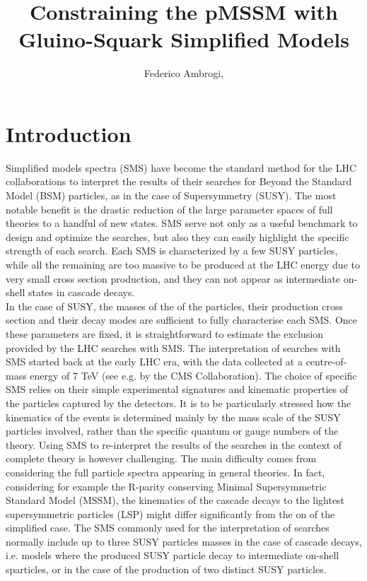 \documentclass[a4paper,11pt]{article}
\title{{\boldmath Constraining the pMSSM  with \\ Gluino-Squark Simplified Models}}
\author[a,]{Federico Ambrogi,\note{Corresponding author.}}
\affiliation[a]{Department of Meteorology and Geophysics, University of Vienna, Vienna, Austria}
\begin{document}
 
\maketitle
\flushbottom
\section{Introduction}
Simplified models spectra (SMS) have become the standard method for the LHC collaborations to interpret the results of their searches for Beyond the Standard Model (BSM) particles, as in the case of Supersymmetry (SUSY). The most notable benefit is the drastic reduction of the large parameter spaces of full theories to a handful of new states. SMS serve not only as a useful benchmark to design and optimize the searches, but also they can easily highlight the specific strength of each search. Each SMS is characterized by a few SUSY particles, while all the remaining are too massive to be produced at the LHC energy due to very small cross section production, and they can not appear as intermediate on-shell states in cascade decays. 
\\
In the case of SUSY, the masses of the of the particles, their production cross section and their decay modes are sufficient to fully characterise each SMS. Once these parameters are fixed, it is straightforward to estimate the exclusion provided by the LHC searches with SMS. The interpretation of searches with SMS started back at the early LHC era, with the data collected at a centre-of-mass energy of 7 TeV (see e.g. \cite{Chatrchyan:2013sza} by the CMS Collaboration). The choice of specific SMS relies on their simple experimental signatures and kinematic properties of the particles captured by the detectors. It is to be particularly stressed how the kinematics of the events is determined mainly by the mass scale of the SUSY particles involved, rather than the specific quantum or gauge numbers of the theory. Using SMS to re-interpret the results  of  the searches in the context of complete theory is however challenging. The main difficulty comes from considering the full particle spectra appearing in general theories. In fact, considering for example the R-parity conserving Minimal Supersymmetric Standard Model (MSSM), the kinematics of the cascade decays to the lightest supersymmetric particles (LSP) might differ significantly from the on of the simplified case. The SMS commonly used for the interpretation of searches normally include up to three SUSY particles masses in the case of cascade decays, i.e. models where the produced SUSY particle decay to intermediate on-shell sparticles, or in the case of the production of two distinct SUSY particles. 
\end{document}
